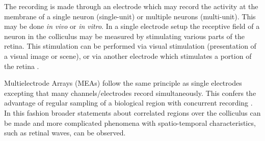 The recording is made through an electrode which may record the activity at the membrane of a single neuron (single-unit) or multiple neurons (multi-unit). This may be done \textit{in vivo} or \textit{in vitro}. In a single electrode setup the receptive field of a neuron in the colliculus may be measured by stimulating various parts of the retina. This stimulation can be performed via visual stimulation (presentation of a visual image or scene), or via another electrode which stimulates a portion of the retina \cite{Boulton1990-ff}.

Multielectrode Arrays (MEAs) follow the same principle as single electrodes excepting that many channels/electrodes record simultaneously. This confers the advantage of regular sampling of a biological region with concurrent recording \cite{Potter2001-lg}. In this fashion broader statements about correlated regions over the colliculus can be made and more complicated phenomena with spatio-temporal characteristics, such as retinal waves, can be observed.
